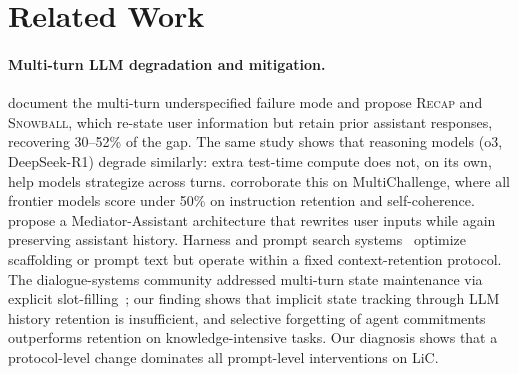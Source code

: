 \documentclass{article}
\begin{document}
\section{Related Work}

\paragraph{Multi-turn LLM degradation and mitigation.}
\citet{laban2025lost} document the multi-turn underspecified failure mode and propose \textsc{Recap} and \textsc{Snowball}, which re-state user information but retain prior assistant responses, recovering 30--52\% of the gap. The same study shows that reasoning models (o3, DeepSeek-R1) degrade similarly: extra test-time compute does not, on its own, help models strategize across turns. \citet{weston2025multichallenge} corroborate this on MultiChallenge, where all frontier models score under 50\% on instruction retention and self-coherence. \citet{li2026intent} propose a Mediator-Assistant architecture that rewrites user inputs while again preserving assistant history. Harness and prompt search systems~\citep{lee2026metaharness,zhang2024aflow,agrawal2025gepa} optimize scaffolding or prompt text but operate within a fixed context-retention protocol. The dialogue-systems community addressed multi-turn state maintenance via explicit slot-filling~\citep{wu2019transferable}; our finding shows that implicit state tracking through LLM history retention is insufficient, and selective forgetting of agent commitments outperforms retention on knowledge-intensive tasks. Our diagnosis shows that a protocol-level change dominates all prompt-level interventions on LiC.
\end{document}
